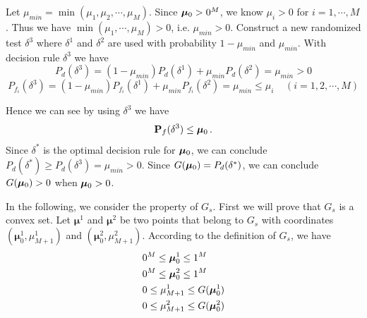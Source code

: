 Let $\mu_{min} = \min(\mu_1, \mu_2, \cdots, \mu_M)$. Since $\boldsymbol{\mu}_0 > 0^M$, we know $\mu_i > 0$ for $i = 1, \cdots, M$. Thus we have $\min(\mu_1, \cdots, \mu_M) > 0$, i.e. $\mu_{min} > 0$. Construct a new randomized test $\delta^3$ where $\delta^1$ and $\delta^2$ are used with probability $1 - \mu_{min} $ and $\mu_{min}$. With decision rule $\delta^3$ we have
\begin{equation}
  P_d(\delta^3) = (1 - \mu_{min})P_d(\delta^1) + \mu_{min}P_d(\delta^2) = \mu_{min} > 0
\end{equation}
\begin{equation}
  P_{f_i}(\delta^3) = (1 - \mu_{min})P_{f_i}(\delta^1) + \mu_{min}P_{f_i}(\delta^2) = \mu_{min} \leq \mu_i \;\;\;\;(i = 1, 2, \cdots, M)
\end{equation}

Hence we can see by using $\delta^3$ we have
\[
  \mathbf{P}_f(\delta^3) \leq \boldsymbol{\mu}_0\,.
\]
Since $\delta^\ast $ is the optimal decision rule for $\boldsymbol{\mu}_0$, we can conclude $P_d(\delta^\ast) \geq  P_d(\delta^3) = \mu_{min} >  0$. Since $G(\boldsymbol{\mu}_0) = P_d(\delta^\ast)$, we can conclude $G(\boldsymbol{\mu}_0) > 0$ when $\boldsymbol{\mu}_0 > 0 $. 


In the following, we consider the property of $G_s$. First we will prove that $G_s$ is a convex set. 
Let $\boldsymbol{\mu}^1$ and  $\boldsymbol{\mu}^2$ be two points that belong to $G_s$ with coordinates $(\boldsymbol{\mu}^1_0, \mu_{M+1}^1)$ and $(\boldsymbol{\mu}^2_0, \mu_{M+1}^2)$. According to the definition of $G_s$, we have 
\begin{subequations}
\label{1120t4}
\begin{align}
\label{1120night6}
&0^M \leq \boldsymbol{\mu}_0^1 \leq 1^M\\
\label{1120night7}
&0^M \leq \boldsymbol{\mu}^2_0 \leq 1^M\\
\label{1120night3}
&0 \leq \mu_{M+1}^1 \leq G(\boldsymbol{\mu}_0^1)\\
\label{1120night4}
&0 \leq \mu_{M+1}^2 \leq G(\boldsymbol{\mu}_0^2)
\end{align}
\end{subequations}

